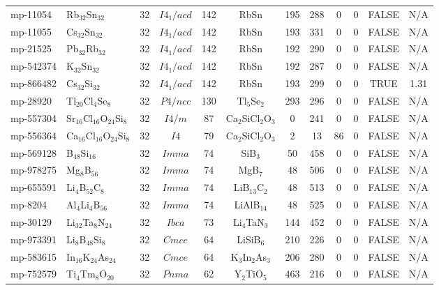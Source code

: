 {\begin{longtable}{llcccccccccc}
    mp-11054 & Rb$_{32}$Sn$_{32}$ & 32    & $I4_1/acd$ & 142   & RbSn  & 195   & 288   & 0     & 0     & FALSE & N/A \\
    mp-11055 & Cs$_{32}$Sn$_{32}$ & 32    & $I4_1/acd$ & 142   & RbSn  & 193   & 331   & 0     & 0     & FALSE & N/A \\
    mp-21525 & Pb$_{32}$Rb$_{32}$ & 32    & $I4_1/acd$ & 142   & RbSn  & 192   & 290   & 0     & 0     & FALSE & N/A \\
    mp-542374 & K$_{32}$Sn$_{32}$ & 32    & $I4_1/acd$ & 142   & RbSn  & 192   & 287   & 0     & 0     & FALSE & N/A \\
    mp-866482 & Cs$_{32}$Si$_{32}$ & 32    & $I4_1/acd$ & 142   & RbSn  & 193   & 299   & 0     & 0     & TRUE  & 1.31  \\
    mp-28920 & Tl$_{20}$Cl$_{4}$Se$_{8}$ & 32    & $P4/ncc$ & 130   & Tl$_{5}$Se$_{2}$ & 293   & 296   & 0     & 0     & FALSE & N/A \\
    mp-557304 & Sr$_{16}$Cl$_{16}$O$_{24}$Si$_{8}$ & 32    & $I4/m$ & 87    & Ca$_{2}$SiCl$_{2}$O$_{3}$ & 0     & 241   & 0     & 0     & FALSE & N/A \\
    mp-556364 & Ca$_{16}$Cl$_{16}$O$_{24}$Si$_{8}$ & 32    & $I4$  & 79    & Ca$_{2}$SiCl$_{2}$O$_{3}$ & 2     & 13    & 86    & 0     & FALSE & N/A \\
    mp-569128 & B$_{48}$Si$_{16}$ & 32    & $Imma$ & 74    & SiB$_{3}$ & 50    & 458   & 0     & 0     & FALSE & N/A \\
    mp-978275 & Mg$_{8}$B$_{56}$ & 32    & $Imma$ & 74    & MgB$_{7}$ & 48    & 506   & 0     & 0     & FALSE & N/A \\
    mp-655591 & Li$_{4}$B$_{52}$C$_{8}$ & 32    & $Imma$ & 74    & LiB$_{13}$C$_{2}$ & 48    & 513   & 0     & 0     & FALSE & N/A \\
    mp-8204 & Al$_{4}$Li$_{4}$B$_{56}$ & 32    & $Imma$ & 74    & LiAlB$_{14}$ & 48    & 525   & 0     & 0     & FALSE & N/A \\
    mp-30129 & Li$_{32}$Ta$_{8}$N$_{24}$ & 32    & $Ibca$ & 73    & Li$_{4}$TaN$_{3}$ & 144   & 452   & 0     & 0     & FALSE & N/A \\
    mp-973391 & Li$_{8}$B$_{48}$Si$_{8}$ & 32    & $Cmce$ & 64    & LiSiB$_{6}$ & 210   & 226   & 0     & 0     & FALSE & N/A \\
    mp-583615 & In$_{16}$K$_{24}$As$_{24}$ & 32    & $Cmce$ & 64    & K$_{3}$In$_{2}$As$_{3}$ & 206   & 280   & 0     & 0     & FALSE & N/A \\
    mp-752579 & Ti$_{4}$Tm$_{8}$O$_{20}$ & 32    & $Pnma$ & 62    & Y$_{2}$TiO$_{5}$ & 463   & 216   & 0     & 0     & FALSE & N/A \\

\end{longtable}}
